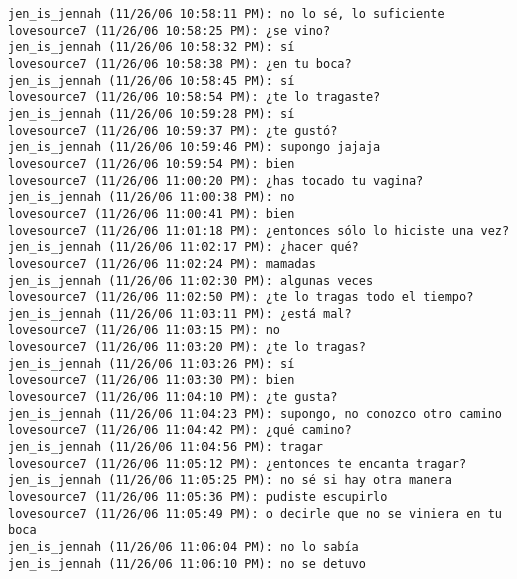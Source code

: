 \begin{verbatim}
jen_is_jennah (11/26/06 10:58:11 PM): no lo sé, lo suficiente
lovesource7 (11/26/06 10:58:25 PM): ¿se vino?
jen_is_jennah (11/26/06 10:58:32 PM): sí
lovesource7 (11/26/06 10:58:38 PM): ¿en tu boca?
jen_is_jennah (11/26/06 10:58:45 PM): sí
lovesource7 (11/26/06 10:58:54 PM): ¿te lo tragaste?
jen_is_jennah (11/26/06 10:59:28 PM): sí
lovesource7 (11/26/06 10:59:37 PM): ¿te gustó?
jen_is_jennah (11/26/06 10:59:46 PM): supongo jajaja
lovesource7 (11/26/06 10:59:54 PM): bien
lovesource7 (11/26/06 11:00:20 PM): ¿has tocado tu vagina?
jen_is_jennah (11/26/06 11:00:38 PM): no
lovesource7 (11/26/06 11:00:41 PM): bien
lovesource7 (11/26/06 11:01:18 PM): ¿entonces sólo lo hiciste una vez?
jen_is_jennah (11/26/06 11:02:17 PM): ¿hacer qué?
lovesource7 (11/26/06 11:02:24 PM): mamadas
jen_is_jennah (11/26/06 11:02:30 PM): algunas veces
lovesource7 (11/26/06 11:02:50 PM): ¿te lo tragas todo el tiempo?
jen_is_jennah (11/26/06 11:03:11 PM): ¿está mal?
lovesource7 (11/26/06 11:03:15 PM): no
lovesource7 (11/26/06 11:03:20 PM): ¿te lo tragas?
jen_is_jennah (11/26/06 11:03:26 PM): sí
lovesource7 (11/26/06 11:03:30 PM): bien
lovesource7 (11/26/06 11:04:10 PM): ¿te gusta?
jen_is_jennah (11/26/06 11:04:23 PM): supongo, no conozco otro camino
lovesource7 (11/26/06 11:04:42 PM): ¿qué camino?
jen_is_jennah (11/26/06 11:04:56 PM): tragar
lovesource7 (11/26/06 11:05:12 PM): ¿entonces te encanta tragar?
jen_is_jennah (11/26/06 11:05:25 PM): no sé si hay otra manera
lovesource7 (11/26/06 11:05:36 PM): pudiste escupirlo
lovesource7 (11/26/06 11:05:49 PM): o decirle que no se viniera en tu boca
jen_is_jennah (11/26/06 11:06:04 PM): no lo sabía
jen_is_jennah (11/26/06 11:06:10 PM): no se detuvo
\end{verbatim}







